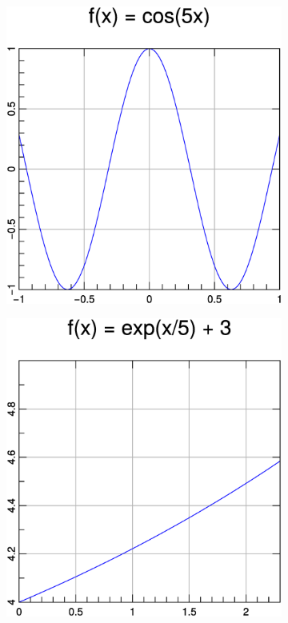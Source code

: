 \documentclass[a4paper]{article}
\begin{document}
\begin{figure}
  \centering
  \begin{subfigure}[hb]{0.32\linewidth}
    \includegraphics[width=\textwidth]{./examples_from_doc/ranges/ranges_1.eps}
  \end{subfigure}
  \hfill
  \begin{subfigure}[hb]{0.32\linewidth}
    \includegraphics[width=\textwidth]{./examples_from_doc/ranges/ranges_2.eps}

\end{subfigure}
\end{figure}
\end{document}
